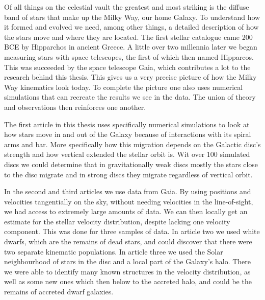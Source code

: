 Of all things on the celestial vault the greatest and most striking is the diffuse band of stars that make up the Milky Way, our home Galaxy. To understand how it formed and evolved we need, among other things, a detailed description of how the stars move and where they are located. The first stellar catalogue came 200 BCE by Hipparchos in ancient Greece. A little over two millennia later we began measuring stars with space telescopes, the first of which then named Hipparcos. This was succeeded by the space telescope Gaia, which contributes a lot to the research behind this thesis. This gives us a very precise picture of how the Milky Way kinematics look today. To complete the picture one also uses numerical simulations that can recreate the results we see in the data. The union of theory and observations then reinforces one another.

The first article in this thesis uses specifically numerical simulations to look at how stars move in and out of the Galaxy because of interactions with its spiral arms and bar. More specifically how this migration depends on the Galactic disc's strength and how vertical extended the stellar orbit is. Wit over 100 simulated discs we could determine that in gravitationally weak discs mostly the stars close to the disc migrate and in strong discs they migrate regardless of vertical orbit.

In the second and third articles we use data from Gaia. By using positions and velocities tangentially on the sky, without needing velocities in the line-of-sight, we had access to extremely large amounts of data. We can then locally get an estimate for the stellar velocity distribution, despite lacking one velocity component. This was done for three samples of data. In article two we used white dwarfs, which are the remains of dead stars, and could discover that there were two separate kinematic populations. In article three we used the Solar neighbourhood of stars in the disc and a local part of the Galaxy's halo. There we were able to identify many known structures in the velocity distribution, as well as some new ones which then below to the accreted halo, and could be the remains of accreted dwarf galaxies. 



